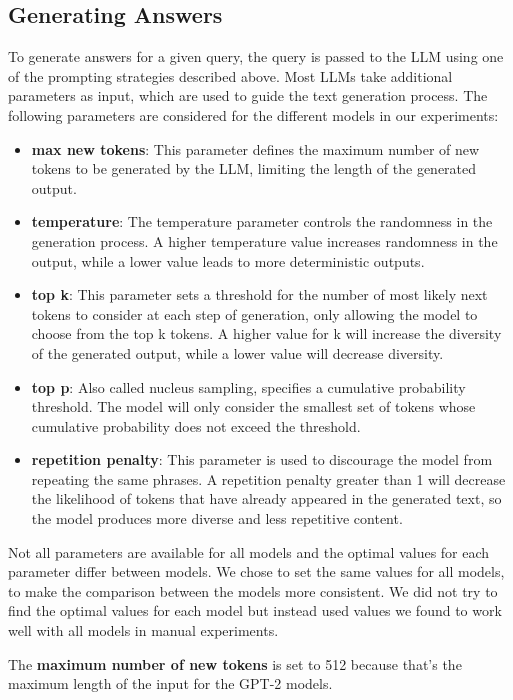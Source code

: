\subsection{Generating Answers}
To generate answers for a given query, the query is passed to the LLM using one of the prompting strategies described above.
Most LLMs take additional parameters as input, which are used to guide the text generation process.
The following parameters are considered for the different models in our experiments:
\begin{itemize}
    \item \textbf{max new tokens}: This parameter defines the maximum number of new tokens to be generated by the LLM, limiting the length of the generated output.
    \item \textbf{temperature}: The temperature parameter controls the randomness in the generation process. A higher temperature value increases randomness in the output, while a lower value leads to more deterministic outputs.
    \item \textbf{top k}: This parameter sets a threshold for the number of most likely next tokens to consider at each step of generation, only allowing the model to choose from the top k tokens. A higher value for k will increase the diversity of the generated output, while a lower value will decrease diversity.
    \item \textbf{top p}:  Also called nucleus sampling, specifies a cumulative probability threshold. The model will only consider the smallest set of tokens whose cumulative probability does not exceed the threshold.
    \item \textbf{repetition penalty}: This parameter is used to discourage the model from repeating the same phrases. A repetition penalty greater than 1 will decrease the likelihood of tokens that have already appeared in the generated text, so the model produces more diverse and less repetitive content.
\end{itemize}
Not all parameters are available for all models and the optimal values for each parameter differ between models.
We chose to set the same values for all models, to make the comparison between the models more consistent.
We did not try to find the optimal values for each model but instead used values we found to work well with all models in manual experiments.

The \textbf{maximum number of new tokens} is set to 512 because that's the maximum length of the input for the GPT-2 models.

